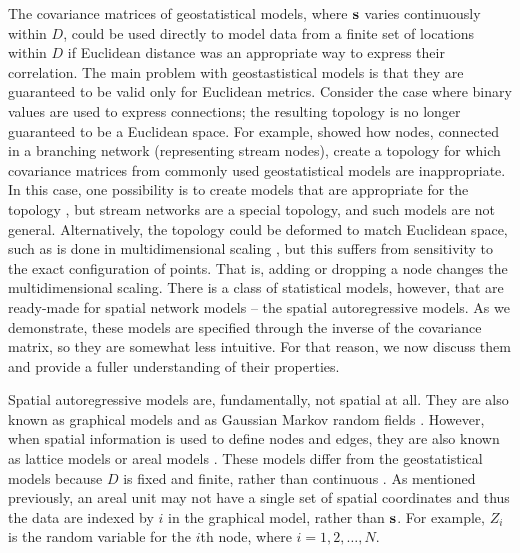 \documentclass[11pt, titlepage]{article}\usepackage[]{graphicx}\usepackage[]{color}
\begin{document}
\begin{spacing}{1.9}
\begin{flushleft}
The covariance matrices of geostatistical models, where $\mathbf{s}$ varies continuously within $D$, could be used directly to model data from a finite set of locations within $D$ if Euclidean distance was an appropriate way to express their correlation. The main problem with geostastistical models is that they are guaranteed to be valid only for Euclidean metrics.  Consider the case where binary values are used to express connections; the resulting topology is no longer guaranteed to be a Euclidean space.  For example, \citet{Ver:Pete:Theo:spat:2006} showed how nodes, connected in a branching network (representing stream nodes), create a topology for which covariance matrices from commonly used geostatistical models are inappropriate.  In this case, one possibility is to create models that are appropriate for the topology \citep[e.g.,][]{Ver:Pete:Move:2010}, but stream networks are a special topology, and such models are not general.  Alternatively, the topology could be deformed to match Euclidean space, such as is done in multidimensional scaling \citep{Curr:NonE:2006}, but this suffers from sensitivity to the exact configuration of points.  That is, adding or dropping a node changes the multidimensional scaling. There is a class of statistical models, however, that are ready-made for spatial network models -- the spatial autoregressive models. As we demonstrate, these models are specified through the inverse of the covariance matrix, so they are somewhat less intuitive.  For that reason, we now discuss them and provide a fuller understanding of their properties.

Spatial autoregressive models are, fundamentally, not spatial at all. They are also known as graphical models \citep[e.g.,][]{Laur:grap:1996, Whit:grap:2009} and as Gaussian Markov random fields \citep[e.g.,][]{Rue:Held:Gaus:2005}. However, when spatial information is used to define nodes and edges, they are also known as lattice models \citep[e.g.,][pg. 8]{Cres:stat:1993} or areal models \citep[e.g.,][pg. 69]{Bane:Carl:Gelf:hier:2014}. These models differ from the geostatistical models because $D$ is fixed and finite, rather than continuous \citep[][pg. 8]{Cres:stat:1993}. As mentioned previously, an areal unit may not have a single set of spatial coordinates and thus the data are indexed by $i$ in the graphical model, rather than $\mathbf{s}$. For example, $Z_i$ is the random variable for the $i$th node, where $i = 1, 2, \dots, N$. 


\end{flushleft}
\end{spacing}
\end{document}
